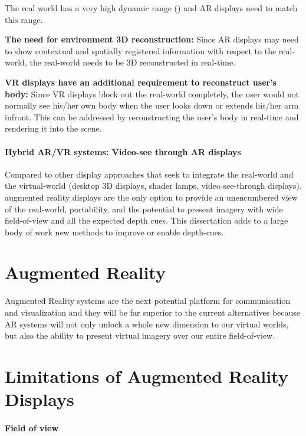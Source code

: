 \begin{compact_enumerate}
The real world has a very high dynamic range () and AR displays need to match this range. 
\item \textbf{The need for environment 3D reconstruction:}
Since AR displays may need to show contextual and spatially registered information with respect to the real-world, the real-world needs to be 3D reconstructed in real-time.
\item \textbf{VR displays have an additional requirement to reconstruct user's body:} 
Since VR displays block out the real-world completely, the user would not normally see his/her own body when the user looks down or extends his/her arm infront. This can be addressed by reconstructing the user's body in real-time and rendering it into the scene.
\end{compact_enumerate}

\paragraph{Hybrid AR/VR systems: Video-see through AR displays}


Compared to other display approaches that seek to integrate the real-world and the virtual-world (desktop 3D displays, shader lamps, video see-through displays), augmented reality displays are the only option to provide an unencumbered view of the real-world, portability, and the potential to present imagery with wide field-of-view and all the expected depth cues.
This dissertation adds to a large body of work new methods to improve or enable depth-cues. 

\section{Augmented Reality}
Augmented Reality systems are the next potential platform for communication and visualization and they will be far superior to the current alternatives because AR systems will not only unlock a whole new dimension to our virtual worlds, but also the ability to present virtual imagery over our entire field-of-view.

\section{Limitations of Augmented Reality Displays}
\paragraph{Field of view}

